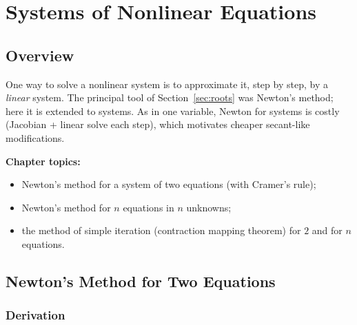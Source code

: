 \documentclass[hidelinks]{article}
\begin{document}
\section{Systems of Nonlinear Equations}\label{sec:nonlinear}

\subsection{Overview}

One way to solve a nonlinear system is to approximate it, step by step, by a \emph{linear} system. The principal tool of Section~\ref{sec:roots} was Newton's method; here it is extended to systems. As in one variable, Newton for systems is costly (Jacobian + linear solve each step), which motivates cheaper secant-like modifications.

\textbf{Chapter topics:}
\begin{itemize}
    \item Newton's method for a system of two equations (with Cramer's rule);
    \item Newton's method for $n$ equations in $n$ unknowns;
    \item the method of simple iteration (contraction mapping theorem) for $2$ and for $n$ equations.
\end{itemize}

\subsection{Newton's Method for Two Equations}

\subsubsection{Derivation}
\end{document}
